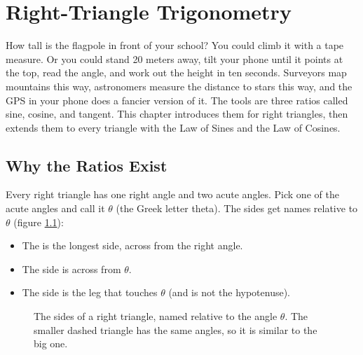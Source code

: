 \chapter{Right-Triangle Trigonometry}

How tall is the flagpole in front of your school? You could climb it with a
tape measure. Or you could stand 20 meters away, tilt your phone until it
points at the top, read the angle, and work out the height in ten seconds.
Surveyors map mountains this way, astronomers measure the distance to stars this
way, and the GPS in your phone does a fancier version of it. The tools are three
ratios called sine, cosine, and tangent. This chapter introduces them for right
triangles, then extends them to every triangle with the Law of Sines and the Law
of Cosines.

\section{Why the Ratios Exist}

Every right triangle has one right angle and two acute angles. Pick one of the
acute angles and call it $\theta$ (the Greek letter theta). The sides get names
relative to $\theta$ (figure \ref{fig:rt-names}):
\begin{itemize}
\item The  is the longest side, across from the right angle.
\item The  side is across from $\theta$.
\item The  side is the leg that touches $\theta$ (and is not
the hypotenuse).
\end{itemize}

\begin{figure}[H]
\centering
{}
\caption{The sides of a right triangle, named relative to the angle $\theta$. The
smaller dashed triangle has the same angles, so it is similar to the big one.}
\label{fig:rt-names}
\end{figure}

